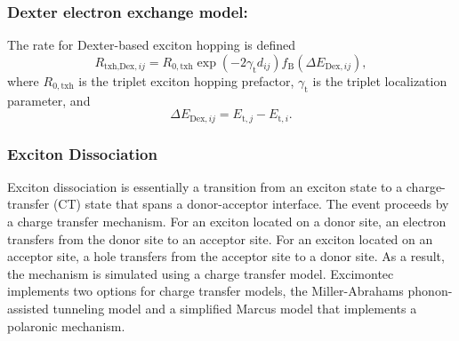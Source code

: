 \documentclass[%
 reprint,onecolumn,notitlepage,
superscriptaddress,longbibliography,
 amsmath,amssymb,
 aps,rmp,floatfix,
]{revtex4-1}
\begin{document}
\subsubsection*{\textbf{Dexter electron exchange model:}}

The rate for Dexter-based exciton hopping is defined
$$R_{\text{txh,Dex},ij} = R_{0,\text{txh}} \exp{\left(- 2 \gamma_{\text{t}} d_{ij} \right)} f_\text{B} \left( \Delta E_{\text{Dex},ij}\right),$$
where $R_{0,\text{txh}}$ is the triplet exciton hopping prefactor, $\gamma_{\text{t}}$ is the triplet localization parameter, and
$$\Delta E_{\text{Dex},ij} = E_{\text{t},j} - E_{\text{t},i}.$$

\subsubsection{Exciton Dissociation}

Exciton dissociation is essentially a transition from an exciton state to a charge-transfer (CT) state that spans a donor-acceptor interface. 
The event proceeds by a charge transfer mechanism. 
For an exciton located on a donor site, an electron transfers from the donor site to an acceptor site. 
For an exciton located on an acceptor site, a hole transfers from the acceptor site to a donor site. 
As a result, the mechanism is simulated using a charge transfer model. 
Excimontec implements two options for charge transfer models, the Miller-Abrahams phonon-assisted tunneling model\cite{miller1960pr} and a simplified Marcus model \cite{marcus1956jcp} that implements a polaronic mechanism.
\end{document}
